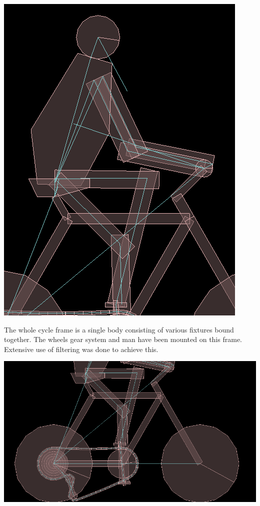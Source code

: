 \documentclass[11pt]{article}
\begin{document}
	 \begin{center}
	\includegraphics[scale=0.4]{pic5}
	\end{center}
The whole cycle frame is a single body consisting of various fixtures bound together. The wheels gear system and man have been mounted on this frame. Extensive use of filtering was done to achieve this.\\	
	\begin{center}
	\includegraphics[scale=0.4]{pic6}
	\end{center}
\end{document}
